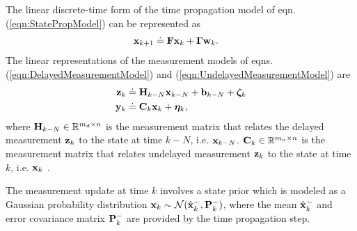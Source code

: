 The linear discrete-time form of the time propagation model of eqn. (\ref{eqn:StatePropModel}) can be represented as
\begin{align}
	\label{eqn:LinearStatePropModel}
	\mathbf{x}_{k+1} &\doteq \mathbf{F} \mathbf{x}_k + \boldsymbol{\Gamma} \mathbf{w}_k.
\end{align}
The linear representations of the measurement models of eqns. (\ref{eqn:DelayedMeasurementModel}) and (\ref{eqn:UndelayedMeasurementModel}) are
\begin{align} \label{eqn:LinearDelayedMeasurementModel}
	\mathbf{z}_k &\doteq \mathbf{H}_{k-N} \mathbf{x}_{k-N} + \mathbf{b}_{k-N} +\boldsymbol{\zeta}_k \\
	\label{eqn:LinearUndelayedMeasurementModel}
	\mathbf{y}_k &\doteq \mathbf{C}_k \mathbf{x}_k + \boldsymbol{\eta}_k,
\end{align}
where $\mathbf{H}_{k-N} \in \mathbb{R}^{m_d \times n}$ is the measurement matrix that relates the delayed measurement $\mathbf{z}_{k}$ to the state at time $k-N$, i.e. $\mathbf{x}_{k-N}$. 
$\mathbf{C}_k\in \mathbb{R}^{m_u \times n}$ is the measurement matrix that relates undelayed measurement $\mathbf{z}_k$ to the state at time $k$, i.e. $\mathbf{x}_k$ .

The measurement update at time $k$ involves a state prior which is modeled as a Gaussian probability distribution $\mathbf{x}_k \sim \mathcal{N}(\hat{\mathbf{x}}_k^-,\mathbf{P}_k^-)$, where the mean $\hat{\mathbf{x}}_k^-$ and error covariance matrix $\mathbf{P}_k^-$ are provided by the time propagation step.